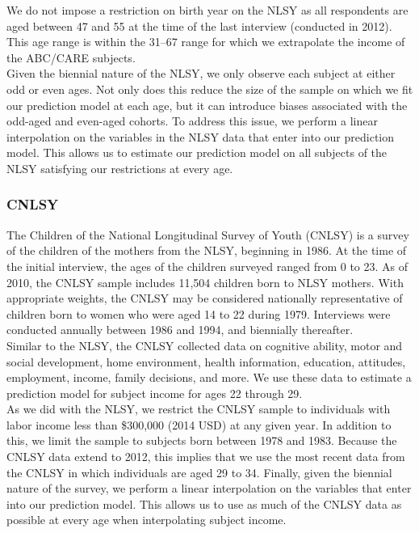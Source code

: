 \noindent We do not impose a restriction on birth year on the NLSY as all respondents are aged between 47 and 55
at the time of the last interview (conducted in 2012). This age range is within the 31--67 range for which
we extrapolate the income of the ABC/CARE subjects. \\

\noindent Given the biennial nature of the NLSY, we only observe each subject at either odd or even
ages. Not only does this reduce the size of the sample on which we fit our prediction model
at each age, but it can introduce biases associated with the odd-aged and even-aged cohorts.
To address this issue, we perform a linear interpolation on the variables in the NLSY data
that enter into our prediction model. This allows us to estimate our prediction model on
all subjects of the NLSY satisfying our restrictions at every age. \\

\subsubsection{CNLSY}
\label{app:subject_income_cnlsy}

\noindent The Children of the National Longitudinal Survey of Youth (CNLSY) is a survey of the children of the mothers from the NLSY, beginning in 1986. At the time of
the initial interview, the ages of the children surveyed ranged from 0 to 23. As of 2010,
the CNLSY sample includes 11,504 children born to NLSY mothers. With appropriate weights,
the CNLSY may be considered nationally representative of children born to women
who were aged 14 to 22 during 1979. Interviews were conducted annually between 1986 and 1994,
and biennially thereafter. \\

\noindent Similar to the NLSY, the CNLSY collected data on cognitive ability, motor and social development,
home environment, health information, education, attitudes, employment, income, family decisions,
and more. We use these data to estimate a prediction model for subject income for ages
22 through 29. \\

\noindent As we did with the NLSY, we restrict the CNLSY sample to individuals with labor income less than
\$300,000 (2014 USD) at any given year. In addition to this, we limit the sample to subjects born
between 1978 and 1983. Because the CNLSY data extend to 2012, this implies that we use the most
recent data from the CNLSY in which individuals are aged 29 to 34. Finally, given the biennial
nature of the survey, we perform a linear interpolation on the variables that enter into our prediction
model. This allows us to use as much of the CNLSY data as possible at every age when
interpolating subject income. \\

